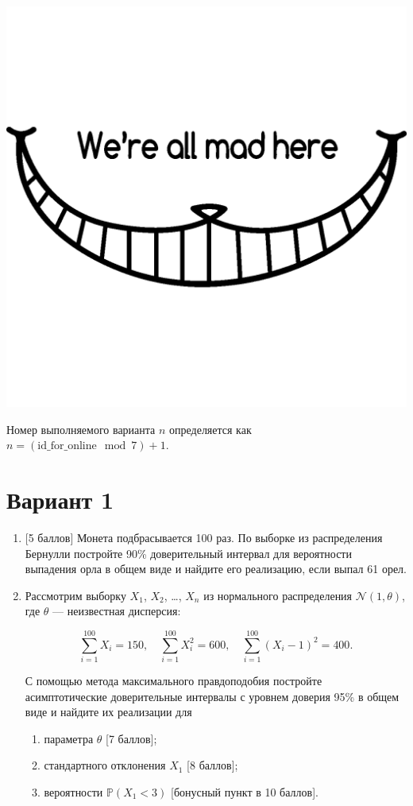 \documentclass[12pt]{article}
\def \cN{\mathcal{N}}
\def \P{\mathbb{P}}
\newcommand \id {\mathrm{id}\_\mathrm{for}\_\mathrm{online}}
\begin{document}
\begin{center}
  \begin{minipage}{5cm}
    \includegraphics[height=30ex]{cheshire_cat.png}
  \end{minipage}
\end{center}
  
\newpage

Номер выполняемого варианта $n$ определяется как $n=(\id \mod 7)+1$. 


\section*{Вариант 1}
\begin{enumerate}

  \item {[5 баллов]} Монета подбрасывается 100 раз. По выборке из распределения Бернулли
  постройте 90\% доверительный интервал для вероятности выпадения орла в общем виде и найдите его
  реализацию, если выпал 61 орел.
  
  \item Рассмотрим выборку $X_1$, $X_2$, \ldots, $X_n$ из нормального распределения $\cN(1, \theta)$, 
  где $\theta$ — неизвестная дисперсия:
  
  \[
  \sum_{i=1}^{100} X_i = 150, \quad \sum_{i=1}^{100} X_i^2 = 600, \quad \sum_{i=1}^{100} (X_i - 1)^2 = 400.  
  \]
  
  С помощью метода максимального правдоподобия 
  постройте асимптотические доверительные интервалы с уровнем доверия 95\% в общем виде и найдите их реализации для  
  
  \begin{enumerate}
    \item параметра $\theta$ {[7 баллов]};
    \item стандартного отклонения $X_1$ {[8 баллов]};
    \item вероятности $\P(X_1 < 3)$ {[бонусный пункт в 10 баллов]}.
  \end{enumerate}
  
  
  
\end{enumerate}
\end{document}
